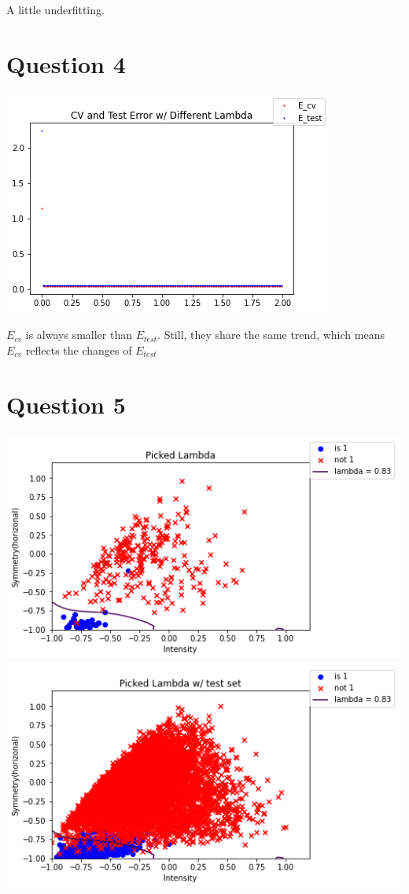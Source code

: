 \documentclass{article}
\def\math#1{$#1$}
\begin{document}
A little underfitting.

\section{Question 4}

\includegraphics[]{4/1}

\math{E_{cv}} is always smaller than \math{E_{test}}. Still, they share the same trend, which means \math{E_{cv}} reflects the changes of \math{E_{test}}

\section{Question 5}

\includegraphics[]{5/1}
\includegraphics[]{5/2}
\end{document}
